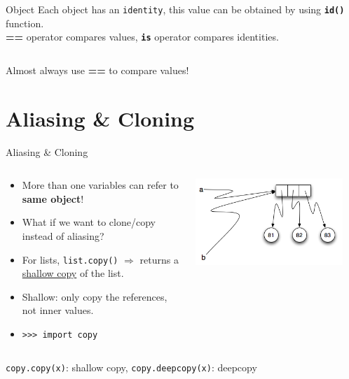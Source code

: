     \begin{frame}{Object}
        \LARGE
        Each object has an \texttt{identity},
        \pause
         this value can be obtained by using \texttt{\textbf{id()}} function.\\
        \pause
        \textbf{==} operator compares values, \textbf{\texttt{is}} operator compares identities. 
        \pause
        \inputminted[frame=single,framesep=2pt]{python3}{../Lecture5/code-examples/identity.py}
        \pause
        Almost always use \textbf{==} to compare values!
    \end{frame}

    \section{Aliasing \& Cloning}
    \begin{frame}{Aliasing \& Cloning}
        \Large
        \begin{columns}
            \begin{column}[c]{0.6\textwidth}
                \begin{itemize}
                    \item More than one variables can refer to \textbf{same object}!
                    \item What if we want to clone/copy instead of aliasing?
                    \item For lists, \texttt{list.copy()} $\Rightarrow$ returns a \underline{shallow copy} of the list.
                    \item Shallow: only copy the references, not inner values.
                    \item \texttt{>>> import copy}
                \end{itemize}
            \end{column}
            \begin{column}[c]{0.4\textwidth}
                \includegraphics[width=0.9\textwidth]{../Lecture5/images/aliasing.png}
            \end{column}
        \end{columns}
        \texttt{copy.copy(x)}: shallow copy, \texttt{copy.deepcopy(x)}: deepcopy   
    \end{frame}


